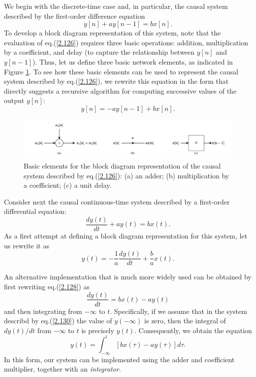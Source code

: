 \documentclass[a4paper,twoside]{book}
\begin{document}
We begin with the discrete-time case and, in particular, the causal system described by the first-order difference equation
\begin{equation}
    y[n]+ay[n-1]=bx[n].
    \label{2.126}
\end{equation}
To develop a block diagram representation of this system, note that the evaluation of eq.\;(\ref{2.126}) requires three basic operations: addition, multiplication by a coefficient, and delay (to capture the relationship between $y[n]$ and $y[n-1]$). Thus, let us define three basic network elements, as indicated in Figure \ref{Fig7}. To see how these basic elements can be used to represent the causal system described by eq.\;(\ref{2.126}), we rewrite this equation in the form that directly suggests a recursive algorithm for computing successive values of the output $y[n]$:
\begin{equation}
    y[n]=-ay[n-1]+bx[n].
    \label{2.127}
\end{equation}

\begin{figure}[htbp]
    \centering
    \includegraphics[width=\linewidth]{Fig7.pdf}
    \caption{Basic elements for the block diagram representation of the causal system described by eq.\;(\ref{2.126}): (a) an adder; (b) multiplication by a coefficient; (c) a unit delay.}
    \label{Fig7}
\end{figure}

Consider next the causal continuous-time system described by a first-order differential equation:
\begin{equation}
    \dfrac{dy(t)}{dt}+ay(t)=bx(t).
    \label{2.128}
\end{equation}
As a first attempt at defining a block diagram representation for this system, let us rewrite it as
\begin{equation}
    y(t)=-\dfrac{1}{a}\dfrac{dy(t)}{dt}+\dfrac{b}{a}x(t).
    \label{2.129}
\end{equation}

An alternative implementation that is much more widely used can be obtained by first rewriting eq.\;(\ref{2.128}) as
\begin{equation}
    \dfrac{dy(t)}{dt}=bx(t)-ay(t)
    \label{2.130}
\end{equation}
and then integrating from $-\infty$ to $t$. Specifically, if we assume that in the system describd by eq.\;(\ref{2.130}) the value of $y(-\infty)$ is zero, then the integral of $dy(t)/dt$ from $-\infty$ to $t$ is precisely $y(t)$. Consequently, we obtain the equation
\begin{equation}
    y(t) = \int_{-\infty}^t\left[bx(\tau)-ay(\tau)\right] d\tau.
    \label{2.131}
\end{equation}
In this form, our system can be implemented using the adder and coefficient multiplier, together with an \textit{integrator}.
\end{document}
